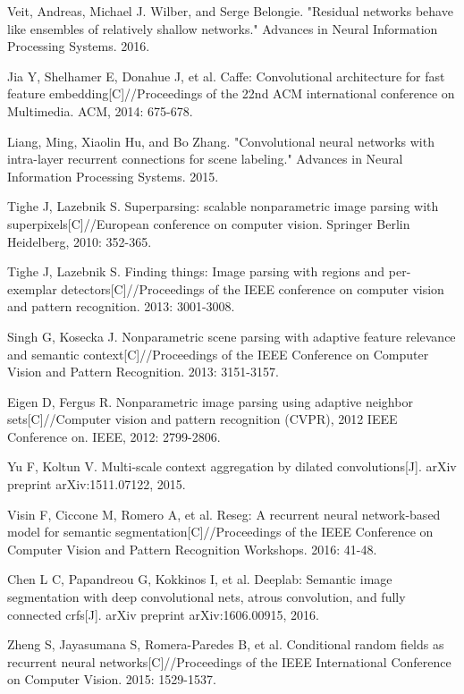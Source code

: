 \documentclass[10.5pt,compsoc]{TsT}
\theoremstyle{mystyle}
\begin{document}
{\begin{thebibliography}{99}
Veit, Andreas, Michael J. Wilber, and Serge Belongie. "Residual networks behave like ensembles of relatively shallow networks." Advances in Neural Information Processing Systems. 2016.

Jia Y, Shelhamer E, Donahue J, et al. Caffe: Convolutional architecture for fast feature embedding[C]//Proceedings of the 22nd ACM international conference on Multimedia. ACM, 2014: 675-678.

Liang, Ming, Xiaolin Hu, and Bo Zhang. "Convolutional neural networks with intra-layer recurrent connections for scene labeling." Advances in Neural Information Processing Systems. 2015.

Tighe J, Lazebnik S. Superparsing: scalable nonparametric image parsing with superpixels[C]//European conference on computer vision. Springer Berlin Heidelberg, 2010: 352-365.

Tighe J, Lazebnik S. Finding things: Image parsing with regions and per-exemplar detectors[C]//Proceedings of the IEEE conference on computer vision and pattern recognition. 2013: 3001-3008.

Singh G, Kosecka J. Nonparametric scene parsing with adaptive feature relevance and semantic context[C]//Proceedings of the IEEE Conference on Computer Vision and Pattern Recognition. 2013: 3151-3157.

Eigen D, Fergus R. Nonparametric image parsing using adaptive neighbor sets[C]//Computer vision and pattern recognition (CVPR), 2012 IEEE Conference on. IEEE, 2012: 2799-2806.

Yu F, Koltun V. Multi-scale context aggregation by dilated convolutions[J]. arXiv preprint arXiv:1511.07122, 2015.

Visin F, Ciccone M, Romero A, et al. Reseg: A recurrent neural network-based model for semantic segmentation[C]//Proceedings of the IEEE Conference on Computer Vision and Pattern Recognition Workshops. 2016: 41-48.

Chen L C, Papandreou G, Kokkinos I, et al. Deeplab: Semantic image segmentation with deep convolutional nets, atrous convolution, and fully connected crfs[J]. arXiv preprint arXiv:1606.00915, 2016.

Zheng S, Jayasumana S, Romera-Paredes B, et al. Conditional random fields as recurrent neural networks[C]//Proceedings of the IEEE International Conference on Computer Vision. 2015: 1529-1537.




\end{thebibliography}}
\end{document}
